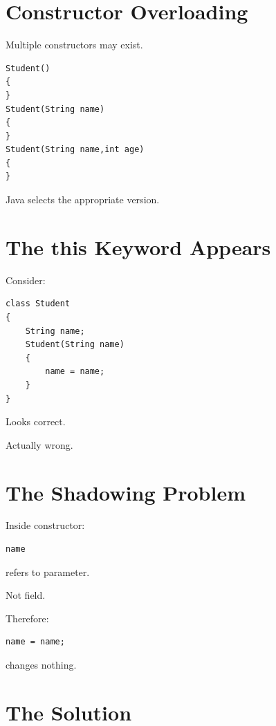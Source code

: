 \documentclass[11pt,a4paper]{book}
\begin{document}

\section{Constructor Overloading}

Multiple constructors may exist.

\begin{verbatim}
Student()
{
}
Student(String name)
{
}
Student(String name,int age)
{
}
\end{verbatim}

Java selects the appropriate version.


\section{The this Keyword Appears}

Consider:

\begin{verbatim}
class Student
{
    String name;
    Student(String name)
    {
        name = name;
    }
}
\end{verbatim}

Looks correct.

Actually wrong.


\section{The Shadowing Problem}

Inside constructor:

\begin{verbatim}
name
\end{verbatim}

refers to parameter.

Not field.

Therefore:

\begin{verbatim}
name = name;
\end{verbatim}

changes nothing.


\section{The Solution}
\end{document}
